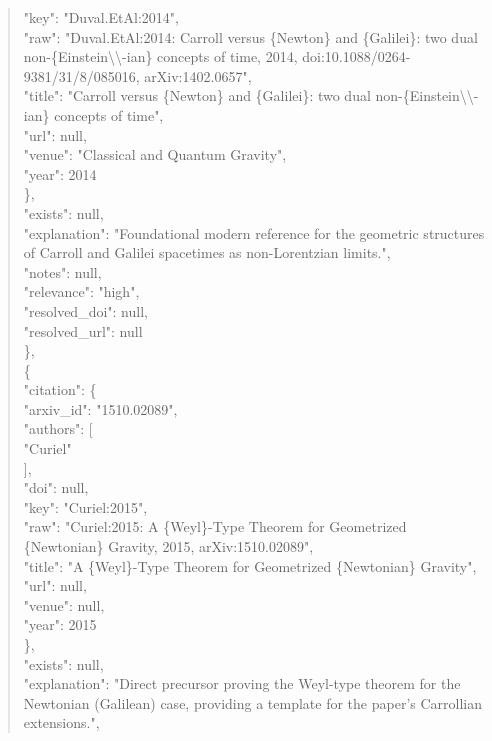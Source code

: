 \documentclass[11pt]{article}
\begin{document}
\begin{quote}
        "key": "Duval.EtAl:2014",\\
        "raw": "Duval.EtAl:2014: Carroll versus \{Newton\} and \{Galilei\}: two dual non-\{Einstein\textbackslash{}\textbackslash{}-ian\} concepts of time, 2014, doi:10.1088/0264-9381/31/8/085016, arXiv:1402.0657",\\
        "title": "Carroll versus \{Newton\} and \{Galilei\}: two dual non-\{Einstein\textbackslash{}\textbackslash{}-ian\} concepts of time",\\
        "url": null,\\
        "venue": "Classical and Quantum Gravity",\\
        "year": 2014\\
      \},\\
      "exists": null,\\
      "explanation": "Foundational modern reference for the geometric structures of Carroll and Galilei spacetimes as non-Lorentzian limits.",\\
      "notes": null,\\
      "relevance": "high",\\
      "resolved\_doi": null,\\
      "resolved\_url": null\\
    \},\\
    \{\\
      "citation": \{\\
        "arxiv\_id": "1510.02089",\\
        "authors": [\\
          "Curiel"\\
        ],\\
        "doi": null,\\
        "key": "Curiel:2015",\\
        "raw": "Curiel:2015: A \{Weyl\}-Type Theorem for Geometrized \{Newtonian\} Gravity, 2015, arXiv:1510.02089",\\
        "title": "A \{Weyl\}-Type Theorem for Geometrized \{Newtonian\} Gravity",\\
        "url": null,\\
        "venue": null,\\
        "year": 2015\\
      \},\\
      "exists": null,\\
      "explanation": "Direct precursor proving the Weyl-type theorem for the Newtonian (Galilean) case, providing a template for the paper's Carrollian extensions.",\\

\end{quote}
\end{document}
